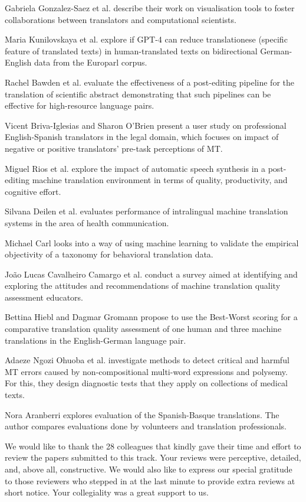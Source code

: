 Gabriela Gonzalez-Saez et al. describe their work  on visualisation tools to foster collaborations between translators and computational scientists. 

Maria Kunilovskaya et al. explore if GPT-4 can reduce translationese (specific feature of translated texts) in human-translated texts on bidirectional German-English data from the Europarl corpus.

Rachel Bawden et al. evaluate the effectiveness of a post-editing pipeline for the translation of scientific abstract demonstrating that such pipelines can be effective for high-resource language pairs.

Vicent Briva-Iglesias and Sharon O'Brien present a user study on professional English-Spanish translators in the legal domain, which focuses on impact of negative or positive translators’ pre-task perceptions of MT.

Miguel Rios et al. explore the impact of automatic speech synthesis in a post-editing machine translation environment in terms of quality, productivity, and cognitive effort.

Silvana Deilen et al. evaluates performance of intralingual machine translation systems in the area of health communication.

Michael Carl looks into a way of using  machine learning to validate the empirical objectivity of a taxonomy for behavioral translation data.

João Lucas Cavalheiro Camargo et al. conduct a survey aimed at identifying and exploring the attitudes and recommendations of machine translation quality assessment educators.

Bettina Hiebl and Dagmar Gromann propose to use the Best-Worst scoring for a comparative translation quality assessment of one human and three machine translations in the English-German language pair.

Adaeze Ngozi Ohuoba et al. investigate methods to detect critical and harmful MT errors caused by non-compositional multi-word expressions and polysemy. For this, they design diagnostic tests that they apply on collections of medical texts.

Nora Aranberri explores evaluation of the Spanish-Basque translations. The author compares evaluations done by volunteers and translation professionals.

We would like to thank the 28 colleagues that kindly gave their time and effort to review the papers submitted to this track. Your reviews were perceptive, detailed, and, above all, constructive. We would also like to express our special gratitude to those reviewers who stepped in at the last minute to provide extra reviews at short notice. Your collegiality was a great support to us.


